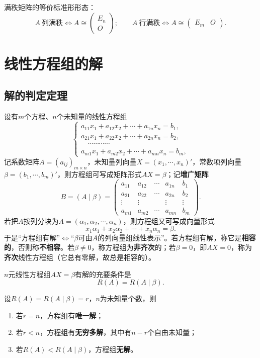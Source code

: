 满秩矩阵的等价标准形形态：
\[
A\ \text{列满秩}\iff A\cong\begin{pmatrix}E_n\\O\end{pmatrix};\qquad
A\ \text{行满秩}\iff A\cong\begin{pmatrix}E_m&O\end{pmatrix}.
\]

\section{线性方程组的解}

\subsection{解的判定定理}

设有$m$个方程、$n$个未知量的线性方程组
\[
\begin{cases}
a_{11}x_1+a_{12}x_2+\cdots+a_{1n}x_n=b_1,\\
a_{21}x_1+a_{22}x_2+\cdots+a_{2n}x_n=b_2,\\
\quad\cdots\cdots\cdots\cdots\\
a_{m1}x_1+a_{m2}x_2+\cdots+a_{mn}x_n=b_m,
\end{cases}
\]
记系数矩阵$A=(a_{ij})_{m\times n}$，未知量列向量$X=(x_1,\cdots,x_n)'$，常数项列向量$\beta=(b_1,\cdots,b_m)'$，则方程组可写成矩阵形式$AX=\beta$；记\textbf{增广矩阵}
\[
B=(A\mid\beta)=\left(\begin{array}{cccc|c}
a_{11}&a_{12}&\cdots&a_{1n}&b_1\\
a_{21}&a_{22}&\cdots&a_{2n}&b_2\\
\vdots&\vdots&&\vdots&\vdots\\
a_{m1}&a_{m2}&\cdots&a_{mn}&b_m
\end{array}\right).
\]
若把$A$按列分块为$A=(\alpha_1,\alpha_2,\cdots,\alpha_n)$，则方程组又可写成向量形式
\[
x_1\alpha_1+x_2\alpha_2+\cdots+x_n\alpha_n=\beta.
\]
于是“方程组有解”$\iff$“$\beta$可由$A$的列向量组线性表示”。若方程组有解，称它是\textbf{相容的}，否则称\textbf{不相容}。若$\beta\neq0$，称方程组为\textbf{非齐次}的；若$\beta=0$，即$AX=0$，称为\textbf{齐次}线性方程组（它总有零解，故总是相容的）。

\begin{theorem}[有解判定]
$n$元线性方程组$AX=\beta$有解的充要条件是
\[
R(A)=R(A\mid\beta).
\]
\end{theorem}

\begin{theorem}[解的个数]
设$R(A)=R(A\mid\beta)=r$，$n$为未知量个数，则
\begin{enumerate}
\item 若$r=n$，方程组有\textbf{唯一解}；
\item 若$r<n$，方程组有\textbf{无穷多解}，其中有$n-r$个自由未知量；
\item 若$R(A)<R(A\mid\beta)$，方程组\textbf{无解}。
\end{enumerate}
\end{theorem}

